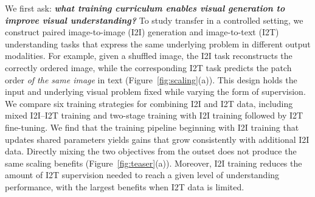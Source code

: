 We first ask: \textbf{\textit{what training curriculum enables visual generation to improve visual understanding?}}
To study transfer in a controlled setting, we construct paired image-to-image (I2I) generation and image-to-text (I2T) understanding tasks that express the same underlying problem in different output modalities.
For example, given a shuffled image, the I2I task reconstructs the correctly ordered image, while the corresponding I2T task predicts the patch order \textit{of the same image} in text (Figure~\ref{fig:scaling}(a)).
This design holds the input and underlying visual problem fixed
while varying the form of supervision.
We compare six training strategies for combining I2I and I2T data, including mixed I2I--I2T training and two-stage training with I2I training followed by I2T 
fine-tuning. 
We find that the training pipeline beginning with I2I training that updates shared parameters yields gains that grow consistently with additional I2I data.
Directly mixing the two objectives from the outset does not produce the same scaling benefits (Figure~\ref{fig:teaser}(a)).
Moreover, I2I training reduces the amount of I2T supervision needed to reach a given level of understanding performance, with the largest benefits when I2T data is limited.

